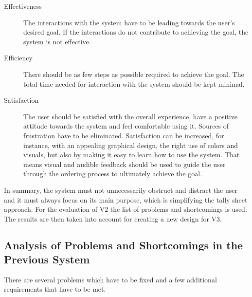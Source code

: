 \documentclass[12pt]{article}
\begin{document}
\begin{description}
  \item [Effectiveness]
        The interactions with the system have to be leading towards the user's desired goal.
        If the interactions do not contribute to achieving the goal, the system is not effective.
  \item [Efficiency]
        There should be as few steps as possible required to achieve the goal.
        The total time needed for interaction with the system should be kept minimal.
  \item [Satisfaction]
        The user should be satisfied with the overall experience, have a positive attitude towards the system and feel comfortable using it. 
        Sources of frustration have to be eliminated.
        Satisfaction can be increased, for instance, with an appealing graphical design, the right use of colors and visuals, 
        but also by making it easy to learn how to use the system.
        That means visual and audible feedback should be used to guide the user through the ordering process to ultimately achieve the goal.

\end{description}

In summary, the system must not unnecessarily obstruct and distract the user and it must always focus on its main purpose, which is simplifying the tally sheet approach.
For the evaluation of V2 the list of problems and shortcomings is used.
The results are then taken into account for creating a new design for V3.

\subsection{Analysis of Problems and Shortcomings in the Previous System}
\label{pa:list}
There are several problems which have to be fixed and a few additional requirements that have to be met.
\end{document}
